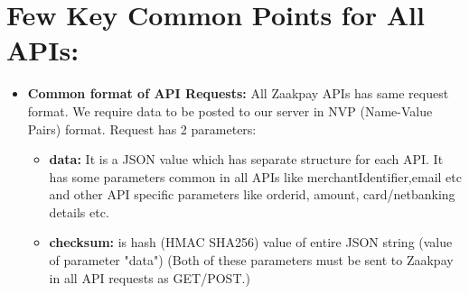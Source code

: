 \documentclass{article}
\begin{document}
\section{Few Key Common Points for All APIs:  }
\begin{itemize}
\item {\bfseries Common format of API Requests:}
All Zaakpay APIs has same request format. We require data to be posted to our server in NVP (Name-Value Pairs) format. Request has 2 parameters: 
\begin{itemize}
\item {\bfseries data:} It is a JSON value which has separate structure for each API. It has some parameters common in  all APIs like merchantIdentifier,email etc and other API specific parameters like orderid, amount, card/netbanking details etc. 
\item {\bfseries checksum:} is hash (HMAC SHA­256) value of entire JSON string (value of parameter "data") 
(Both of these parameters must be sent to Zaakpay in all API requests as GET/POST.)
\end{itemize}


\end{itemize}
\end{document}
